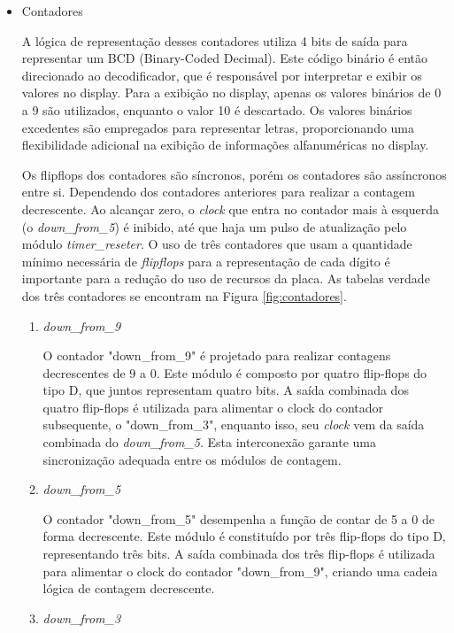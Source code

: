 \documentclass[
	article,			%
	11pt,				%
	oneside,			%
	a4paper,			%
	english,			%
	brazil,				%
	sumario=tradicional
	]{abntex2}
\begin{document}
\begin{itemize}
    \item Contadores

A lógica de representação desses contadores utiliza 4 bits de saída para representar um BCD (Binary-Coded Decimal). Este código binário é então direcionado ao decodificador, que é responsável por interpretar e exibir os valores no display. Para a exibição no display, apenas os valores binários de 0 a 9 são utilizados, enquanto o valor 10 é descartado. Os valores binários excedentes são empregados para representar letras, proporcionando uma flexibilidade adicional na exibição de informações alfanuméricas no display.

Os flipflops dos contadores são síncronos, porém os contadores são assíncronos entre si. Dependendo dos contadores anteriores para realizar a contagem decrescente. Ao alcançar zero, o \textit{clock} que entra no contador mais à esquerda (o \textit{down\_from\_5}) é inibido, até que haja um pulso de atualização pelo módulo \textit{timer\_reseter}. O uso de três contadores que usam a quantidade mínimo necessária de \textit{flipflops} para a representação de cada dígito é importante para a redução do uso de recursos da placa. As tabelas verdade dos três contadores se encontram na Figura \ref{fig:contadores}.

    \begin{enumerate}
        \item \textit{down\_from\_9}

        O contador "down\_from\_9" é projetado para realizar contagens decrescentes de 9 a 0. Este módulo é composto por quatro flip-flops do tipo D, que juntos representam quatro bits. A saída combinada dos quatro flip-flops é utilizada para alimentar o clock do contador subsequente, o "down\_from\_3", enquanto isso, seu \textit{clock} vem da saída combinada do \textit{down\_from\_5}. Esta interconexão garante uma sincronização adequada entre os módulos de contagem.
        
        \item \textit{down\_from\_5}

        O contador "down\_from\_5" desempenha a função de contar de 5 a 0 de forma decrescente. Este módulo é constituído por três flip-flops do tipo D, representando três bits. A saída combinada dos três flip-flops é utilizada para alimentar o clock do contador "down\_from\_9", criando uma cadeia lógica de contagem decrescente.
        
        \item \textit{down\_from\_3}


\end{enumerate}
\end{itemize}
\end{document}
